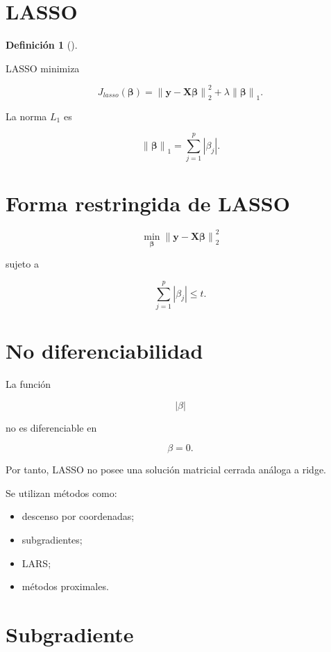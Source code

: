 \documentclass[
  spanish,
  11pt,
  letterpaper,
  DIV=11,
  numbers=noendperiod]{scrreprt}
\providecommand{\tightlist}{%
  \setlength{\itemsep}{0pt}\setlength{\parskip}{0pt}}
\theoremstyle{definition}
\newtheorem{definition}{Definición}[chapter]
\theoremstyle{plain}
\theoremstyle{definition}
\theoremstyle{remark}
\begin{document}
\section{LASSO}\label{lasso}

\begin{definition}[]\protect\hypertarget{def-lasso}{}\label{def-lasso}

LASSO minimiza

\[
J_{lasso}(\boldsymbol{\beta})
=
\left\|
\mathbf{y}
-
\mathbf{X}\boldsymbol{\beta}
\right\|_2^2
+
\lambda
\left\|
\boldsymbol{\beta}
\right\|_1.
\]

\end{definition}

La norma \(L_1\) es

\[
\left\|
\boldsymbol{\beta}
\right\|_1
=
\sum_{j=1}^{p}
|\beta_j|.
\]

\section{Forma restringida de LASSO}\label{forma-restringida-de-lasso}

\[
\min_{\boldsymbol{\beta}}
\left\|
\mathbf{y}
-
\mathbf{X}\boldsymbol{\beta}
\right\|_2^2
\]

sujeto a

\[
\sum_{j=1}^{p}
|\beta_j|
\leq
t.
\]

\section{No diferenciabilidad}\label{no-diferenciabilidad}

La función

\[
|\beta|
\]

no es diferenciable en

\[
\beta=0.
\]

Por tanto, LASSO no posee una solución matricial cerrada análoga a
ridge.

Se utilizan métodos como:

\begin{itemize}
\tightlist
\item
  descenso por coordenadas;
\item
  subgradientes;
\item
  LARS;
\item
  métodos proximales.
\end{itemize}

\section{Subgradiente}\label{subgradiente}
\end{document}
